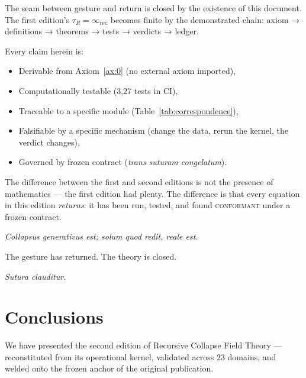 \documentclass[
  aps,
  prd,
  preprint,
  superscriptaddress,
  nofootinbib,
  floatfix,
  longbibliography
]{revtex4-2}
\newcommand{\tR}{\tau_{\!R}}
\newcommand{\regime}[1]{\textrm{\upshape\scshape#1}}
\newcommand{\conform}{\regime{conformant}}
\newcommand{\lat}[1]{\textit{#1}}
\begin{document}
The seam between gesture and return is closed by the
existence of this document.
The first edition's $\tR = \infty_{\mathrm{rec}}$
becomes finite by the demonstrated chain:
axiom → definitions → theorems → tests → verdicts → ledger.

Every claim herein is:
\begin{itemize}[nosep,leftmargin=*]
  \item Derivable from Axiom~\ref{ax:0}
    (no external axiom imported),
  \item Computationally testable
    (3{,}27 tests in CI),
  \item Traceable to a specific module
    (Table~\ref{tab:correspondence}),
  \item Falsifiable by a specific mechanism
    (change the data, rerun the kernel, the verdict changes),
  \item Governed by frozen contract
    (\lat{trans suturam congelatum}).
\end{itemize}

The difference between the first and second editions is not
the presence of mathematics — the first edition had plenty.
The difference is that every equation in this edition
\emph{returns}: it has been run, tested, and found
\conform{} under a frozen contract.

\lat{Collapsus generativus est; solum quod redit, reale est.}

The gesture has returned. The theory is closed.

\lat{Sutura clauditur.}

\section{Conclusions}\label{sec:conclusions}

We have presented the second edition of Recursive Collapse
Field Theory — reconstituted from its operational kernel,
validated across 23 domains, and welded onto the frozen
anchor of the original publication.
\end{document}
